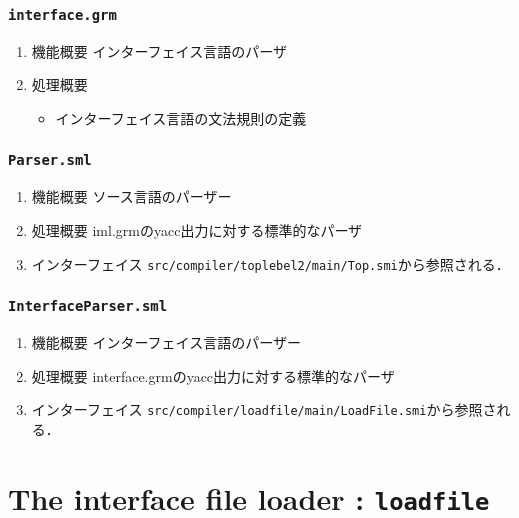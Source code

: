\documentclass{jbook}
\newcommand{\txt}[2]{#2}
\newcommand{\code}[1]{\mbox{\large\tt #1}}
\begin{document}
\subsection{\code{interface.grm}}
\begin{enumerate}
\item 機能概要 インターフェイス言語のパーザ
\item 処理概要 
\begin{itemize}
\item インターフェイス言語の文法規則の定義
\end{itemize}
\end{enumerate}

\subsection{\code{Parser.sml}}
\begin{enumerate}
\item 機能概要 ソース言語のパーザー
\item 処理概要 iml.grmのyacc出力に対する標準的なパーザ
\item インターフェイス
\code{src/compiler/toplebel2/main/Top.smi}から参照される．
\end{enumerate}

\subsection{\code{InterfaceParser.sml}}
\begin{enumerate}
\item 機能概要 インターフェイス言語のパーザー
\item 処理概要 interface.grmのyacc出力に対する標準的なパーザ
\item インターフェイス
\code{src/compiler/loadfile/main/LoadFile.smi}から参照される．
\end{enumerate}
\else%
\fi%


% 
\chapter{\txt
{インターフェイスローダ：\code{loadfile}}
{The interface file loader : \code{loadfile}}
}
\label{chap:Loadfile}
\end{document}
